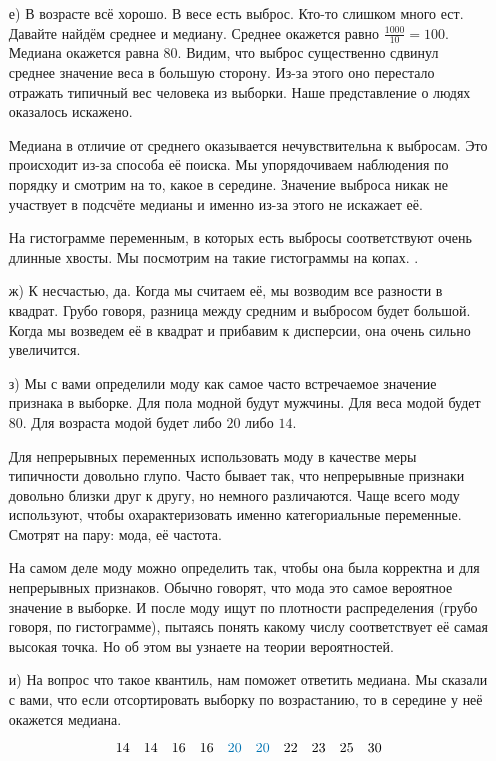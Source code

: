 \documentclass[12pt, a4paper, oneside]{article}
\begin{document}
\begin{enumerate}
	\item[е)] 	В возрасте всё хорошо. В весе есть выброс. Кто-то слишком много ест. Давайте найдём среднее и медиану. Среднее окажется равно $\frac{1000}{10} = 100$. Медиана окажется равна $80$. Видим, что выброс существенно сдвинул среднее значение веса в большую сторону. Из-за этого оно перестало отражать типичный вес человека из выборки. Наше представление о людях оказалось искажено. 

	Медиана в отличие от среднего оказывается нечувствительна к выбросам. Это происходит из-за способа её поиска. Мы упорядочиваем наблюдения по порядку и смотрим на то, какое в середине. Значение выброса никак не участвует в подсчёте медианы и именно из-за этого не искажает её. 
	
	На гистограмме переменным, в которых есть выбросы соответствуют очень длинные хвосты. Мы посмотрим на такие гистограммы на копах. 	
	. 
	\item[ж)]  К несчастью, да.  Когда мы считаем её, мы возводим все разности в квадрат. Грубо говоря, разница между средним и выбросом будет большой. Когда мы возведем её в квадрат и прибавим к дисперсии, она очень сильно увеличится. 
	
	\item[з)] Мы с вами определили моду как самое часто встречаемое значение признака в выборке. Для пола модной будут мужчины. Для веса модой будет $80$. Для возраста модой будет либо $20$ либо $14$.  
	
	Для непрерывных переменных использовать моду в качестве меры типичности довольно глупо. Часто бывает так, что непрерывные признаки довольно близки друг к другу, но немного различаются. Чаще всего моду используют, чтобы охарактеризовать именно категориальные переменные. Смотрят на пару: мода, её частота. 
	
	На самом деле моду можно определить так, чтобы она была корректна и для непрерывных признаков. Обычно говорят, что мода это самое вероятное значение в выборке. И после моду ищут по плотности распределения (грубо говоря, по гистограмме), пытаясь понять какому числу соответствует её самая высокая точка. Но об этом вы узнаете на теории вероятностей. 
	
	\item[и)]  На вопрос что такое квантиль, нам поможет ответить медиана. Мы сказали с вами, что если отсортировать выборку по возрастанию, то в середине у неё окажется медиана. 
	
	\[
	14 \quad 14  \quad 16  \quad 16  \quad {\color{myblue}{20}}  \quad {\color{myblue}{20}}  \quad 22  \quad 23  \quad 25  \quad 30
	\]
	

\end{enumerate}
\end{document}

